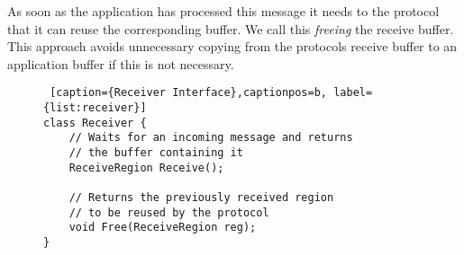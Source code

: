 As soon as the application  has processed this message it needs to the protocol that it can reuse the corresponding buffer.
We call this \emph{freeing} the receive buffer. This approach avoids unnecessary copying from the protocols receive buffer 
to an application buffer if this is not necessary.

\begin{figure}[htp]
\begin{lstlisting} [caption={Receiver Interface},captionpos=b, label={list:receiver}] 
class Receiver {
    // Waits for an incoming message and returns
    // the buffer containing it
    ReceiveRegion Receive();

    // Returns the previously received region 
    // to be reused by the protocol
    void Free(ReceiveRegion reg);
}
\end{lstlisting}
\end{figure}






